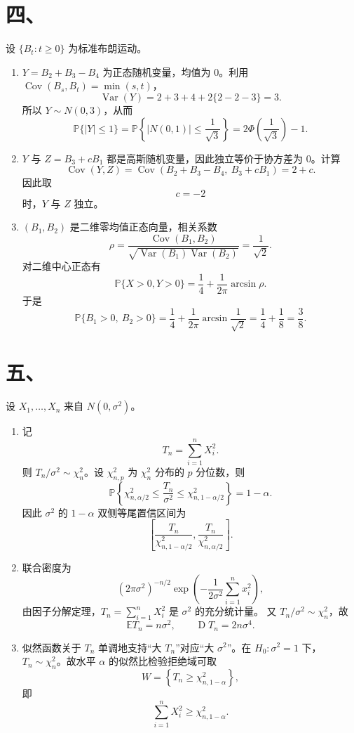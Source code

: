 \documentclass[UTF8,zihao=-4,fontset=windows]{ctexart}
\newcommand{\Prob}{\mathbb P}
\newcommand{\EX}{\mathbb E}
\newcommand{\DD}{\operatorname D}
\newcommand{\Var}{\operatorname{Var}}
\begin{document}
\section*{四、}
设 $\{B_t:t\ge 0\}$ 为标准布朗运动。

\begin{enumerate}
  \item $Y=B_2+B_3-B_4$ 为正态随机变量，均值为 $0$。利用
  $\operatorname{Cov}(B_s,B_t)=\min(s,t)$，
  \[
    \Var(Y)=2+3+4+2\{2-2-3\}=3.
  \]
  所以 $Y\sim N(0,3)$，从而
  \[
    \Prob\{|Y|\le 1\}
    =\Prob\left\{|N(0,1)|\le \frac1{\sqrt3}\right\}
    =2\Phi\left(\frac1{\sqrt3}\right)-1.
  \]

  \item $Y$ 与 $Z=B_3+cB_1$ 都是高斯随机变量，因此独立等价于协方差为 $0$。计算
  \[
    \operatorname{Cov}(Y,Z)
    =\operatorname{Cov}(B_2+B_3-B_4,\ B_3+cB_1)
    =2+c.
  \]
  因此取
  \[
    c=-2
  \]
  时，$Y$ 与 $Z$ 独立。

  \item $(B_1,B_2)$ 是二维零均值正态向量，相关系数
  \[
    \rho=\frac{\operatorname{Cov}(B_1,B_2)}{\sqrt{\Var(B_1)\Var(B_2)}}=\frac1{\sqrt2}.
  \]
  对二维中心正态有
  \[
    \Prob\{X>0,Y>0\}=\frac14+\frac{1}{2\pi}\arcsin\rho.
  \]
  于是
  \[
    \Prob\{B_1>0,\ B_2>0\}
    =\frac14+\frac{1}{2\pi}\arcsin\frac1{\sqrt2}
    =\frac14+\frac18
    =\frac38.
  \]
\end{enumerate}

\section*{五、}
设 $X_1,\ldots,X_n$ 来自 $N(0,\sigma^2)$。

\begin{enumerate}
  \item 记
  \[
    T_n=\sum_{i=1}^n X_i^2.
  \]
  则 $T_n/\sigma^2\sim \chi_n^2$。设 $\chi^2_{n,p}$ 为 $\chi_n^2$ 分布的 $p$ 分位数，则
  \[
    \Prob\left\{\chi^2_{n,\alpha/2}\le \frac{T_n}{\sigma^2}\le
    \chi^2_{n,1-\alpha/2}\right\}=1-\alpha.
  \]
  因此 $\sigma^2$ 的 $1-\alpha$ 双侧等尾置信区间为
  \[
    \left[
      \frac{T_n}{\chi^2_{n,1-\alpha/2}},
      \frac{T_n}{\chi^2_{n,\alpha/2}}
    \right].
  \]

  \item 联合密度为
  \[
    (2\pi\sigma^2)^{-n/2}\exp\left(-\frac{1}{2\sigma^2}
    \sum_{i=1}^n x_i^2\right),
  \]
  由因子分解定理，$T_n=\sum_{i=1}^n X_i^2$ 是 $\sigma^2$ 的充分统计量。
  又 $T_n/\sigma^2\sim \chi_n^2$，故
  \[
    \EX T_n=n\sigma^2,\qquad
    \DD T_n=2n\sigma^4.
  \]

  \item 似然函数关于 $T_n$ 单调地支持“大 $T_n$”对应“大 $\sigma^2$”。在 $H_0:\sigma^2=1$ 下，
  $T_n\sim \chi_n^2$。故水平 $\alpha$ 的似然比检验拒绝域可取
  \[
    W=\left\{T_n\ge \chi^2_{n,1-\alpha}\right\},
  \]
  即
  \[
    \sum_{i=1}^n X_i^2\ge \chi^2_{n,1-\alpha}.
  \]
\end{enumerate}
\end{document}
